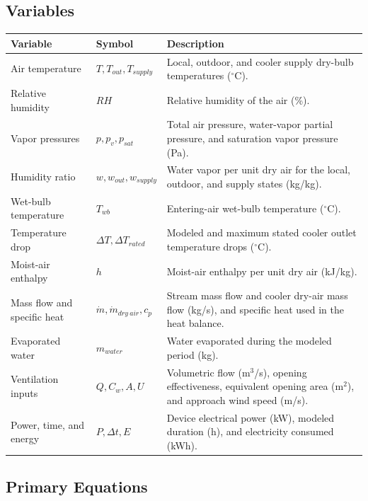 \subsection{Variables}
\begin{table}[H]
  \centering
  \renewcommand{\arraystretch}{1.3}
  \begin{tabularx}{\textwidth}{p{}lY}
    \toprule
    \textbf{Variable} & \textbf{Symbol} & \textbf{Description} \\
    \midrule
    Air temperature & $T, T_{out}, T_{supply}$ & Local, outdoor, and cooler supply dry-bulb temperatures ($^\circ$C). \\
     Relative humidity & $RH$ & Relative humidity of the air (\%). \\
    Vapor pressures & $p, p_v, p_{sat}$ & Total air pressure, water-vapor partial pressure, and saturation vapor pressure (Pa). \\
     Humidity ratio & $w, w_{out}, w_{supply}$ & Water vapor per unit dry air for the local, outdoor, and supply states (kg/kg). \\
    Wet-bulb temperature & $T_{wb}$ & Entering-air wet-bulb temperature ($^\circ$C). \\
     Temperature drop & $\Delta T, \Delta T_{rated}$ & Modeled and maximum stated cooler outlet temperature drops ($^\circ$C). \\
    Moist-air enthalpy & $h$ & Moist-air enthalpy per unit dry air (kJ/kg). \\
     Mass flow and specific heat & $\dot m,\dot m_{dry\ air},c_p$ & Stream mass flow and cooler dry-air mass flow (kg/s), and specific heat used in the heat balance. \\
    Evaporated water & $m_{water}$ & Water evaporated during the modeled period (kg). \\
     Ventilation inputs & $Q,C_w,A,U$ & Volumetric flow (m$^3$/s), opening effectiveness, equivalent opening area (m$^2$), and approach wind speed (m/s). \\
    Power, time, and energy & $P,\Delta t,E$ & Device electrical power (kW), modeled duration (h), and electricity consumed (kWh). \\
    \bottomrule
  \end{tabularx}
\end{table}

\subsection{Primary Equations}
 
